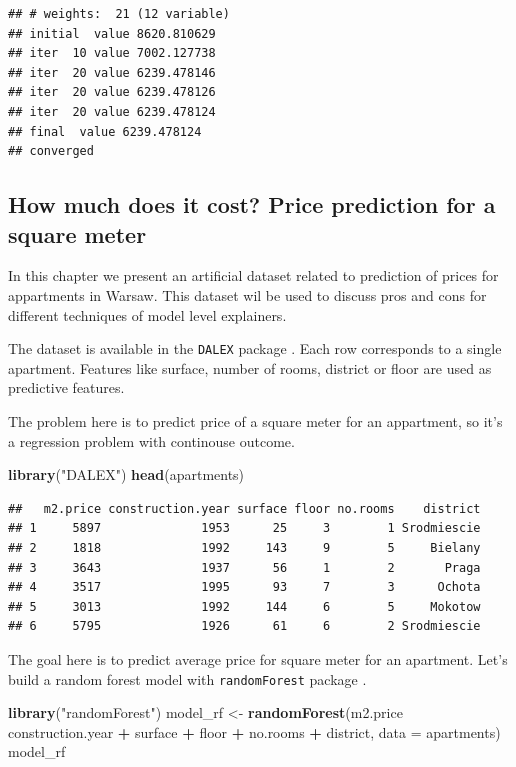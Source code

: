 \documentclass[]{krantz}
\newenvironment{Shaded}{\begin{snugshade}}{\end{snugshade}}
\newcommand{\DataTypeTok}[1]{\textcolor[rgb]{0.13,0.29,0.53}{#1}}
\newcommand{\KeywordTok}[1]{\textcolor[rgb]{0.13,0.29,0.53}{\textbf{#1}}}
\newcommand{\NormalTok}[1]{#1}
\newcommand{\OperatorTok}[1]{\textcolor[rgb]{0.81,0.36,0.00}{\textbf{#1}}}
\newcommand{\StringTok}[1]{\textcolor[rgb]{0.31,0.60,0.02}{#1}}
\theoremstyle{definition}
\theoremstyle{definition}
\theoremstyle{definition}
\theoremstyle{remark}
\begin{document}
\begin{verbatim}
## # weights:  21 (12 variable)
## initial  value 8620.810629 
## iter  10 value 7002.127738
## iter  20 value 6239.478146
## iter  20 value 6239.478126
## iter  20 value 6239.478124
## final  value 6239.478124 
## converged
\end{verbatim}

\hypertarget{apartmentsDataset}{%
\subsection{How much does it cost? Price prediction for a square
meter}\label{apartmentsDataset}}

In this chapter we present an artificial dataset related to prediction
of prices for appartments in Warsaw. This dataset wil be used to discuss
pros and cons for different techniques of model level explainers.

The dataset is available in the \texttt{DALEX} package \citep{R-DALEX}.
Each row corresponds to a single apartment. Features like surface,
number of rooms, district or floor are used as predictive features.

The problem here is to predict price of a square meter for an
appartment, so it's a regression problem with continouse outcome.

\begin{Shaded}
\begin{Highlighting}[]
\KeywordTok{library}\NormalTok{(}\StringTok{"DALEX"}\NormalTok{)}
\KeywordTok{head}\NormalTok{(apartments)}
\end{Highlighting}
\end{Shaded}

\begin{verbatim}
##   m2.price construction.year surface floor no.rooms    district
## 1     5897              1953      25     3        1 Srodmiescie
## 2     1818              1992     143     9        5     Bielany
## 3     3643              1937      56     1        2       Praga
## 4     3517              1995      93     7        3      Ochota
## 5     3013              1992     144     6        5     Mokotow
## 6     5795              1926      61     6        2 Srodmiescie
\end{verbatim}

The goal here is to predict average price for square meter for an
apartment. Let's build a random forest model with \texttt{randomForest}
package \citep{R-randomForest}.

\begin{Shaded}
\begin{Highlighting}[]
\KeywordTok{library}\NormalTok{(}\StringTok{"randomForest"}\NormalTok{)}
\NormalTok{model_rf <-}\StringTok{ }\KeywordTok{randomForest}\NormalTok{(m2.price }\OperatorTok{~}\StringTok{ }\NormalTok{construction.year }\OperatorTok{+}\StringTok{ }\NormalTok{surface }\OperatorTok{+}\StringTok{ }\NormalTok{floor }\OperatorTok{+}\StringTok{ }\NormalTok{no.rooms }\OperatorTok{+}\StringTok{ }\NormalTok{district, }\DataTypeTok{data =}\NormalTok{ apartments)}
\NormalTok{model_rf}
\end{Highlighting}
\end{Shaded}
\end{document}
